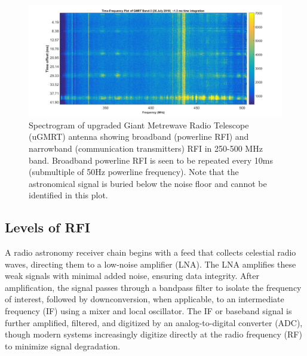 \begin{figure}
    \centering
    \includegraphics[scale=0.25]{Hardware Excision Techniques/figures/time_freq(1).jpg}
    \caption{Spectrogram of upgraded Giant Metrewave Radio Telescope (uGMRT) \citep{gupta2017upgraded} antenna showing broadband (powerline RFI) and narrowband (communication transmitters) RFI in 250-500 MHz band. Broadband powerline RFI is seen to be repeated every 10ms (submultiple of 50Hz powerline frequency). Note that the astronomical signal is buried below the noise floor and cannot be identified in this plot.}
    \label{fig:ugmrt-rfi}
\end{figure}




\subsection{Levels of RFI}
\label{subsection:hardware:introduction: levels}
A radio astronomy receiver chain begins with a feed that collects celestial radio waves, directing them to a low-noise amplifier (LNA). The LNA amplifies these weak signals with minimal added noise, ensuring data integrity. After amplification, the signal passes through a bandpass filter to isolate the frequency of interest, followed by downconversion, when applicable, to an intermediate frequency (IF) using a mixer and local oscillator. The IF or baseband signal is further amplified, filtered, and digitized by an analog-to-digital converter (ADC), though modern systems increasingly digitize directly at the radio frequency (RF) to minimize signal degradation.

